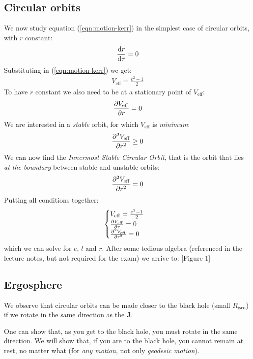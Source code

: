 \documentclass[../template.tex]{subfiles}
\begin{document}
\subsection{Circular orbits}
We now study equation (\ref{eqn:motion-kerr}) in the simplest case of circular orbits, with $r$ constant:
\begin{align*}
    \dv{r}{\tau} = 0
\end{align*} 
Substituting in (\ref{eqn:motion-kerr}) we get:
\begin{align*}
    V_{\mathrm{eff}} = \frac{e^2-1}{2} 
\end{align*}
To have $r$ constant we also need to be at a stationary point of $V_{\mathrm{eff}}$:
\begin{align*}
    \pdv{V_{\mathrm{eff} }}{r} = 0
\end{align*}  
We are interested in a \textit{stable} orbit, for which $V_{\mathrm{eff} }$ is \textit{minimum}:
\begin{align*}
    \pdv[2]{V_{\mathrm{eff} }}{r} \geq 0
\end{align*}   
We can now find the \textit{Innermost Stable Circular Orbit}, that is the orbit that lies \textit{at the boundary} between stable and unstable orbits:
\begin{align*}
    \pdv[2]{V_{\mathrm{eff} }}{r} = 0
\end{align*}  
Putting all conditions together:
\begin{align*}
    \begin{cases}
        V_{\mathrm{eff}}=\frac{e^2-1}{2}\\
        \pdv{V_{\mathrm{eff} }}{r} = 0\\
        \pdv[2]{V_{\mathrm{eff} }}{r} = 0 
    \end{cases}
\end{align*}
which we can solve for $e$, $l$ and $r$. After some tedious algebra (referenced in the lecture notes, but not required for the exam) we arrive to:
[Figure 1]

\subsection{Ergosphere}
We observe that circular orbits can be made closer to the black hole (small $R_{\mathrm{isco}}$) if we rotate in the same direction as the $\bm{J}$.  

One can show that, as you get  to the black hole, you must rotate in the same direction. We will show that, if you are  to the black hole, you cannot remain at rest, no matter what (for \textit{any motion}, not only \textit{geodesic motion}). 
\end{document}
